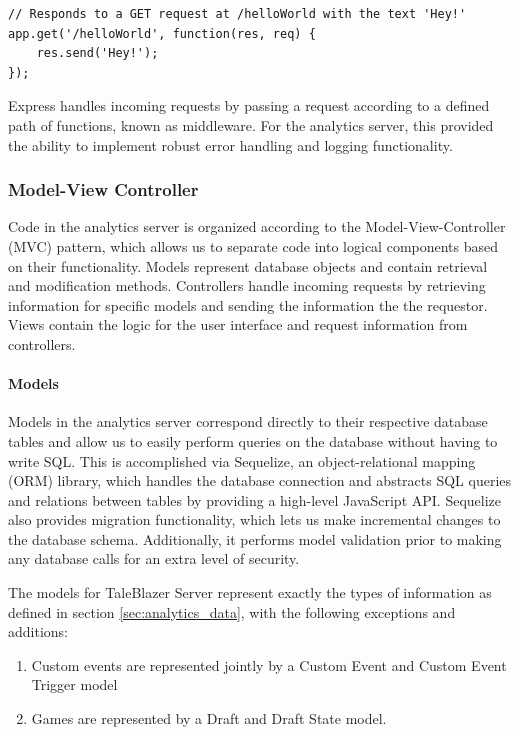 \medskip
\begin{lstlisting}[caption={[Express URL Routing Example]Example of Express' URL routing}]
// Responds to a GET request at /helloWorld with the text 'Hey!'
app.get('/helloWorld', function(res, req) {
	res.send('Hey!');
});
\end{lstlisting}

Express handles incoming requests by passing a request according to a defined path of functions, known as middleware. For the analytics server, this provided the ability to implement robust error handling and logging functionality. 

\subsubsection{Model-View Controller}

Code in the analytics server is organized according to the Model-View-Controller (MVC) pattern, which allows us to separate code into logical components based on their functionality. Models represent database objects and contain retrieval and modification methods. Controllers handle incoming requests by retrieving information for specific models and sending the information the the requestor. Views contain the logic for the user interface and request information from controllers. 

\paragraph{Models} 
Models in the analytics server correspond directly to their respective database tables and allow us to easily perform queries on the database without having to write SQL. This is accomplished via Sequelize, an object-relational mapping (ORM) library, which handles the database connection and abstracts SQL queries and relations between tables by providing a high-level JavaScript API. Sequelize also provides migration functionality, which lets us make incremental changes to the database schema. Additionally, it performs model validation prior to making any database calls for an extra level of security.

The models for TaleBlazer Server represent exactly the types of information as defined in section \ref{sec:analytics_data}, with the following exceptions and additions:

	\begin{enumerate}
		\item Custom events are represented jointly by a Custom Event and Custom Event Trigger model
		\item Games are represented by a Draft and Draft State model.
	\end{enumerate}

